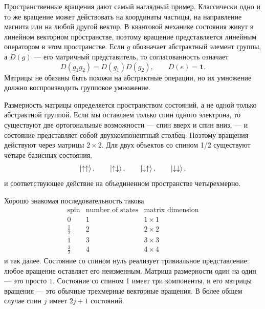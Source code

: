 Пространственные вращения дают самый наглядный пример. Классически одно и то же вращение может действовать на координаты частицы, на направление магнита или на любой другой вектор. В квантовой механике состояния живут в линейном векторном пространстве, поэтому вращение представляется линейным оператором в этом пространстве. Если \(g\) обозначает абстрактный элемент группы, а \(D(g)\) — его матричный представитель, то согласованность означает
\begin{equation}
D(g_1g_2)=D(g_1)D(g_2),
\qquad
D(e)=\boldsymbol 1.
\end{equation}
Матрицы не обязаны быть похожи на абстрактные операции, но их умножение должно воспроизводить групповое умножение.

Размерность матрицы определяется пространством состояний, а не одной только абстрактной группой. Если мы оставляем только спин одного электрона, то существуют две ортогональные возможности — спин вверх и спин вниз, — и состояние представляет собой двухкомпонентный столбец. Поэтому вращения действуют через матрицы \(2\times2\). Для двух объектов со спином 1/2 существуют четыре базисных состояния,
\begin{equation}
\left\lvert\uparrow\uparrow\right\rangle,\qquad
\left\lvert\uparrow\downarrow\right\rangle,\qquad
\left\lvert\downarrow\uparrow\right\rangle,\qquad
\left\lvert\downarrow\downarrow\right\rangle,
\end{equation}
и соответствующее действие на объединенном пространстве четырехмерно.

Хорошо знакомая последовательность такова
\begin{equation}
\begin{array}{c|c|c}
\text{spin} & \text{number of states} & \text{matrix dimension}\\
\hline
0 & 1 & 1\times1\\
\frac12 & 2 & 2\times2\\
1 & 3 & 3\times3\\
\frac32 & 4 & 4\times4
\end{array}
\end{equation}
и так далее. Состояние со спином нуль реализует тривиальное представление: любое вращение оставляет его неизменным. Матрица размерности один на один — это просто \(1\). Состояние со спином 1 имеет три компоненты, и его матрицы вращения — это обычные трехмерные векторные вращения. В более общем случае спин \(j\) имеет \(2j+1\) состояний.

